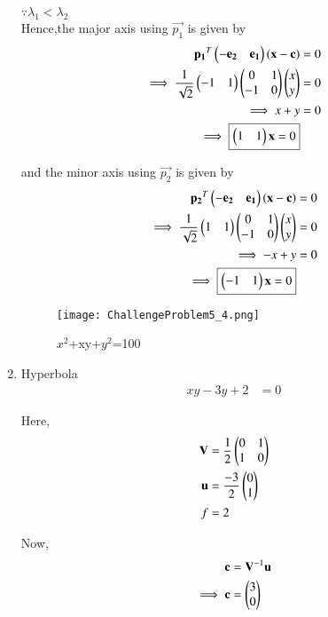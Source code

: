 \documentclass[journal,12pt,twocolumn]{IEEEtran}
\begin{document}
\begin{enumerate}
    $\because \lambda_1<\lambda_2$ \\
    Hence,the major axis using $\vec{p_1}$ is given by
    \begin{align}
        \mathbf{p_1}^T\begin{pmatrix}-\mathbf{e_2} & \mathbf{e_1}\end{pmatrix}\left(\mathbf{x}-\mathbf{c}\right) &= 0 \\
        \implies \frac{1}{\sqrt{2}}\begin{pmatrix}-1 & 1\end{pmatrix}\begin{pmatrix}0 & 1 \\ -1 & 0\end{pmatrix}\begin{pmatrix}x \\ y\end{pmatrix} &= 0 \\
        \implies x+y &= 0 \\
        \implies \boxed{\begin{pmatrix}1 & 1\end{pmatrix}\mathbf{x} =0}
    \end{align}
    
    and the minor axis using $\vec{p_2}$ is given by
    \begin{align}
        \mathbf{p_2}^T\begin{pmatrix}-\mathbf{e_2} & \mathbf{e_1}\end{pmatrix}\left(\mathbf{x}-\mathbf{c}\right) &= 0 \\
        \implies \frac{1}{\sqrt{2}}\begin{pmatrix}1 & 1\end{pmatrix}\begin{pmatrix}0 & 1 \\ -1 & 0\end{pmatrix}\begin{pmatrix}x \\ y\end{pmatrix} &= 0 \\
        \implies -x+y &= 0 \\
        \implies \boxed{\begin{pmatrix}-1 & 1\end{pmatrix}\mathbf{x} =0}
    \end{align}
    
    \begin{figure}[!ht]
    \centering
    \texttt{[image: ChallengeProblem5\_4.png]}
    \caption{$x^2$+xy+$y^2$=100}
    \label{ex4}	
    \end{figure}
    
    \item Hyperbola
    \begin{align}
        xy-3y+2 &= 0
    \end{align}
    
    Here,
    \begin{align}
    \mathbf{V} &= \frac{1}{2}\begin{pmatrix}0 & 1 \\ 1 & 0\end{pmatrix} \\
    \mathbf{u} &= \frac{-3}{2}\begin{pmatrix}0 \\ 1\end{pmatrix} \\
    f &= 2
    \end{align}

    Now,
    \begin{align}
    \mathbf{c} &= \mathbf{V}^{-1}\mathbf{u}\\
    \implies \mathbf{c} &= \begin{pmatrix}3 \\ 0\end{pmatrix}
    \end{align}


\end{enumerate}
\end{document}
